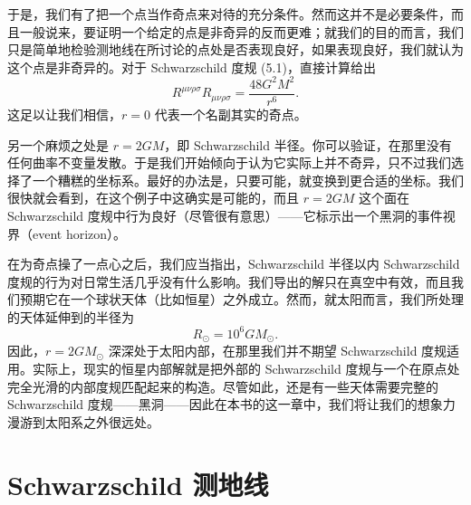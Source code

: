 于是，我们有了把一个点当作奇点来对待的充分条件。然而这并不是必要条件，而且一般说来，要证明一个给定的点是非奇异的反而更难；就我们的目的而言，我们只是简单地检验测地线在所讨论的点处是否表现良好，如果表现良好，我们就认为这个点是非奇异的。对于 Schwarzschild 度规 (5.1)，直接计算给出
\begin{equation*}
R^{\mu\nu\rho\sigma}R_{\mu\nu\rho\sigma} = \frac{48G^2M^2}{r^6}.
\tag{5.50}
\end{equation*}
这足以让我们相信，$r = 0$ 代表一个名副其实的奇点。

另一个麻烦之处是 $r = 2GM$，即 Schwarzschild 半径。你可以验证，在那里没有任何曲率不变量发散。于是我们开始倾向于认为它实际上并不奇异，只不过我们选择了一个糟糕的坐标系。最好的办法是，只要可能，就变换到更合适的坐标。我们很快就会看到，在这个例子中这确实是可能的，而且 $r = 2GM$ 这个面在 Schwarzschild 度规中行为良好（尽管很有意思）——它标示出一个黑洞的事件视界（event horizon）。

在为奇点操了一点心之后，我们应当指出，Schwarzschild 半径以内 Schwarzschild 度规的行为对日常生活几乎没有什么影响。我们导出的解只在真空中有效，而且我们预期它在一个球状天体（比如恒星）之外成立。然而，就太阳而言，我们所处理的天体延伸到的半径为
\begin{equation*}
R_\odot = 10^6 GM_\odot.
\tag{5.51}
\end{equation*}
因此，$r = 2GM_\odot$ 深深处于太阳内部，在那里我们并不期望 Schwarzschild 度规适用。实际上，现实的恒星内部解就是把外部的 Schwarzschild 度规与一个在原点处完全光滑的内部度规匹配起来的构造。尽管如此，还是有一些天体需要完整的 Schwarzschild 度规——黑洞——因此在本书的这一章中，我们将让我们的想象力漫游到太阳系之外很远处。

\section{Schwarzschild 测地线}

